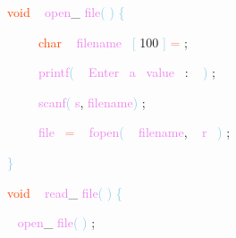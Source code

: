 \documentclass[10, usernames, dvipsnames]{beamer}
\begin{document}
\begin{frame}

 \textcolor{OrangeRed}{void}
\textcolor{White}{\ }
\textcolor{Violet}{open}\textcolor{Sepia}{\_}
\textcolor{Violet}{file}\textcolor{SkyBlue}{(}
\textcolor{SkyBlue}{)}
\textcolor{SkyBlue}{\{ }

 \textcolor{White}{\ }
\textcolor{White}{\ }
\textcolor{White}{\ }
\textcolor{OrangeRed}{char}
\textcolor{White}{\ }
\textcolor{Violet}{filename}\textcolor{White}{\ }
\textcolor{SkyBlue}{[}
\textcolor{RedViolet}{100}
\textcolor{SkyBlue}{]}
\textcolor{Salmon}{=}
\textcolor{Sepia}{;}

 \textcolor{White}{\ }
\textcolor{White}{\ }
\textcolor{White}{\ }
\textcolor{Violet}{printf}\textcolor{SkyBlue}{(}
\textcolor{White}{\ }
\textcolor{Violet}{Enter}\textcolor{White}{\ }
\textcolor{Violet}{a}\textcolor{White}{\ }
\textcolor{Violet}{value}\textcolor{White}{\ }
\textcolor{Sepia}{:}
\textcolor{White}{\ }
\textcolor{SkyBlue}{)}
\textcolor{Sepia}{;}

 \textcolor{White}{\ }
\textcolor{White}{\ }
\textcolor{White}{\ }
\textcolor{Violet}{scanf}\textcolor{SkyBlue}{(}
\textcolor{Violet}{s}\textcolor{Sepia}{,}
\textcolor{Violet}{filename}\textcolor{SkyBlue}{)}
\textcolor{Sepia}{;}

 \textcolor{White}{\ }
\textcolor{White}{\ }
\textcolor{White}{\ }
\textcolor{Violet}{file}\textcolor{White}{\ }
\textcolor{Salmon}{=}
\textcolor{White}{\ }
\textcolor{Violet}{fopen}\textcolor{SkyBlue}{(}
\textcolor{White}{\ }
\textcolor{Violet}{filename}\textcolor{Sepia}{,}
\textcolor{White}{\ }
\textcolor{Violet}{r}\textcolor{White}{\ }
\textcolor{SkyBlue}{)}
\textcolor{Sepia}{;}

 \textcolor{SkyBlue}{\} }

 
 \textcolor{OrangeRed}{void}
\textcolor{White}{\ }
\textcolor{Violet}{read}\textcolor{Sepia}{\_}
\textcolor{Violet}{file}\textcolor{SkyBlue}{(}
\textcolor{SkyBlue}{)}
\textcolor{SkyBlue}{\{ }

 \textcolor{White}{\   }
\textcolor{Violet}{open}\textcolor{Sepia}{\_}
\textcolor{Violet}{file}\textcolor{SkyBlue}{(}
\textcolor{SkyBlue}{)}
\textcolor{Sepia}{;}

 \end{frame}
\end{document}
